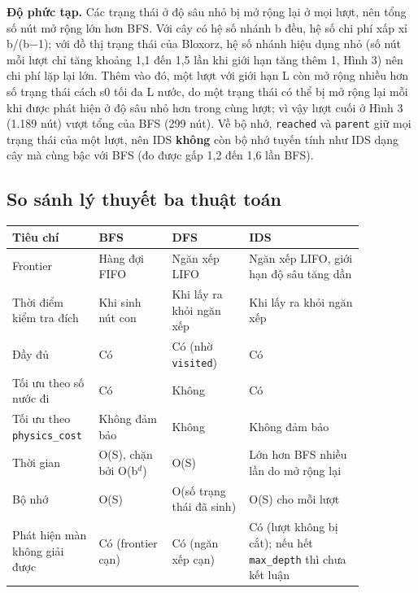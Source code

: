 \textbf{Độ phức tạp.} Các trạng thái ở độ sâu nhỏ bị mở rộng lại ở mọi lượt, nên tổng số nút mở rộng lớn hơn BFS. Với cây có hệ số nhánh b đều, hệ số chi phí xấp xỉ b/(b−1); với đồ thị trạng thái của Bloxorz, hệ số nhánh hiệu dụng nhỏ (số nút mỗi lượt chỉ tăng khoảng 1,1 đến 1,5 lần khi giới hạn tăng thêm 1, Hình 3) nên chi phí lặp lại lớn. Thêm vào đó, một lượt với giới hạn L còn mở rộng nhiều hơn số trạng thái cách s0 tối đa L nước, do một trạng thái có thể bị mở rộng lại mỗi khi được phát hiện ở độ sâu nhỏ hơn trong cùng lượt; vì vậy lượt cuối ở Hình 3 (1.189 nút) vượt tổng của BFS (299 nút). Về bộ nhớ, \texttt{reached} và \texttt{parent} giữ mọi trạng thái của một lượt, nên IDS \textbf{không} còn bộ nhớ tuyến tính như IDS dạng cây mà cùng bậc với BFS (đo được gấp 1,2 đến 1,6 lần BFS).

\subsection{So sánh lý thuyết ba thuật toán}

{\renewcommand{\arraystretch}{1.25}
\begin{longtable}{|>{\raggedright\arraybackslash}p{0.161\linewidth}|>{\raggedright\arraybackslash}p{0.194\linewidth}|>{\raggedright\arraybackslash}p{0.200\linewidth}|>{\raggedright\arraybackslash}p{0.305\linewidth}|}
\hline
\textbf{Tiêu chí} & \textbf{BFS} & \textbf{DFS} & \textbf{IDS} \\ \hline
\endhead
\hline
\endlastfoot
Frontier & Hàng đợi FIFO & Ngăn xếp LIFO & Ngăn xếp LIFO, giới hạn độ sâu tăng dần \\ \hline
Thời điểm kiểm tra đích & Khi sinh nút con & Khi lấy ra khỏi ngăn xếp & Khi lấy ra khỏi ngăn xếp \\ \hline
Đầy đủ & Có & Có (nhờ \texttt{visited}) & Có \\ \hline
Tối ưu theo số nước đi & Có & Không & Có \\ \hline
Tối ưu theo \texttt{physics\_\allowbreak{}cost} & Không đảm bảo & Không & Không đảm bảo \\ \hline
Thời gian & O(\textbar{}S\textbar{}), chặn bởi O(b$^{d}$) & O(\textbar{}S\textbar{}) & Lớn hơn BFS nhiều lần do mở rộng lại \\ \hline
Bộ nhớ & O(\textbar{}S\textbar{}) & O(số trạng thái đã sinh) & O(\textbar{}S\textbar{}) cho mỗi lượt \\ \hline
Phát hiện màn không giải được & Có (frontier cạn) & Có (ngăn xếp cạn) & Có (lượt không bị cắt); nếu hết \texttt{max\_\allowbreak{}depth} thì chưa kết luận \\
\end{longtable}
}
